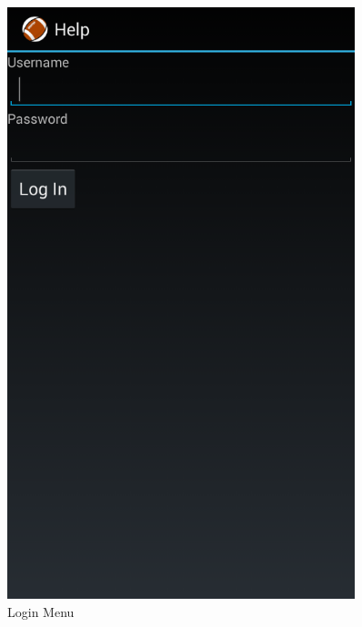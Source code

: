 \documentclass[hidelinks,a4paper,12pt]{article}
\begin{document}
		\begin{figure}[!htb]
  		\centering
  			\begin{minipage}[b]{0.4\textwidth}
    			\includegraphics[width=0.9\textwidth]{./images/login_menu.png}
    			\caption{Login Menu}
  			\end{minipage}
  		\hfill
  			\begin{minipage}[b]{0.4\textwidth}

\end{minipage}
\end{figure}
\end{document}

